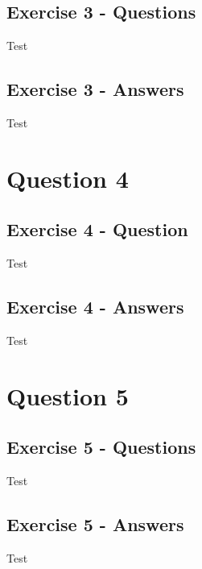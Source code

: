 \documentclass{scrreprt}
\begin{document}
\section{Exercise 3 - Questions}\label{E3Q}
Test




\section{Exercise 3 - Answers}\label{E3A}
Test


	
\newpage
\chapter{Question 4}
\section{Exercise 4 - Question}\label{E4Q}
Test


\section{Exercise 4 - Answers}\label{E4A}
Test
	
	
	
	
\newpage
\chapter{Question 5}
\section{Exercise 5 - Questions}\label{E5Q}
Test


\section{Exercise 5 - Answers}\label{E5A}
Test


	
\end{document}
